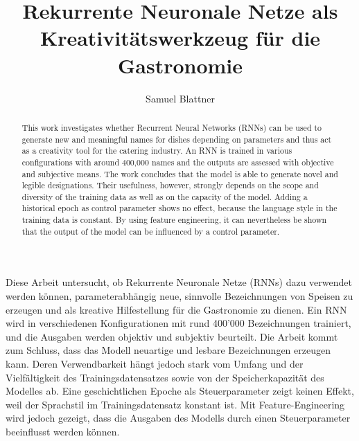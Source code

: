 \documentclass{ffhsthesis}
\begin{document}
    \title{Rekurrente Neuronale Netze als Kreativitätswerkzeug für die Gastronomie}
    \author{Samuel Blattner}


    \maketitle

    \begin{zusammenfassung}
        Diese Arbeit untersucht, ob Rekurrente Neuronale Netze (RNNs) dazu verwendet werden können,
        parameterabhängig neue, sinnvolle Bezeichnungen von Speisen zu erzeugen und als kreative Hilfestellung für die Gastronomie zu dienen.
        Ein RNN wird in verschiedenen Konfigurationen mit rund 400'000 Bezeichnungen trainiert, und die Ausgaben werden objektiv und subjektiv beurteilt.
        Die Arbeit kommt zum Schluss, dass das Modell neuartige und lesbare Bezeichnungen erzeugen kann.
        Deren Verwendbarkeit hängt jedoch stark vom Umfang und der Vielfältigkeit des Trainingsdatensatzes sowie von der Speicherkapazität des Modelles ab.
        Eine geschichtlichen Epoche als Steuerparameter zeigt keinen Effekt, weil der Sprachstil im Trainingsdatensatz konstant ist.
        Mit Feature-Engineering wird jedoch gezeigt, dass die Ausgaben des Modells durch einen Steuerparameter beeinflusst werden können.

    \end{zusammenfassung}

    \begin{abstract}
        This work investigates whether Recurrent Neural Networks (RNNs) can be used to generate new and meaningful names for
        dishes depending on parameters and thus act as a creativity tool for the catering industry.
        An RNN is trained in various configurations with around 400,000 names and the outputs are assessed with objective and subjective means.
        The work concludes that the model is able to generate novel and legible designations.
        Their usefulness, however, strongly depends on the scope and diversity of the training data as well as on the capacity of the model.
        Adding a historical epoch as control parameter shows no effect, because the language style in the training data is constant.
        By using feature engineering, it can nevertheless be shown that the output of the model can be influenced by a control parameter.

    \end{abstract}
\end{document}
